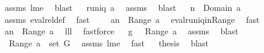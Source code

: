 \begin{isabellebody}
\ assms{\isacharparenleft}{}{\isacharcomma}{}{\isacharcomma}{}{\isacharparenright}\ lm{}{}e\ \isamarkupfalse%
\ blast\isanewline
{}\isamarkupfalse%
\ \isamarkupfalse%
\ {\isachardoublequoteopen}runiq\ {\isacharquery}a{\isachardoublequoteclose}\ \isamarkupfalse%
\ assms{\isacharparenleft}{}{\isacharcomma}{}{\isacharcomma}{}{\isacharparenright}\ \isamarkupfalse%
\ blast\isanewline
{}\isamarkupfalse%
\ \isamarkupfalse%
\ {\isachardoublequoteopen}n\ {\isasymin}\ Domain\ {\isacharquery}a{\isachardoublequoteclose}\ \isamarkupfalse%
\ assms{\isacharparenleft}{}{\isacharparenright}\ eval{\isacharunderscore}rel{\isacharunderscore}def\ \isamarkupfalse%
\ fast\isanewline
{}\isamarkupfalse%
\ \isamarkupfalse%
\ \isamarkupfalse%
\ {\isachardoublequoteopen}{\isacharquery}a{\isacharcomma}{\isacharcomma}n\ {\isasymin}\ Range\ {\isacharquery}a{\isachardoublequoteclose}\ \isamarkupfalse%
\ eval{\isacharunderscore}runiq{\isacharunderscore}in{\isacharunderscore}Range\ \isamarkupfalse%
\ fast\ \isanewline
{}\isamarkupfalse%
\ \isamarkupfalse%
\ {\isachardoublequoteopen}{\isacharquery}a{\isacharcomma}{\isacharcomma}{\isacharcomma}n\ {\isasymin}\ Range\ {\isacharquery}a{\isachardoublequoteclose}\ \isamarkupfalse%
\ lll{}{}\ \isamarkupfalse%
\ fastforce\isanewline
{}\isamarkupfalse%
\ \isamarkupfalse%
\ {\isachardoublequoteopen}g\ {\isasymin}\ {\isasymUnion}\ Range\ {\isacharquery}a{\isachardoublequoteclose}\ \isamarkupfalse%
\ assms\ \isamarkupfalse%
\ blast\ \isanewline
{}\isamarkupfalse%
\ \isamarkupfalse%
\ {\isachardoublequoteopen}{\isasymUnion}\ Range\ {\isacharquery}a\ {\isasymsubseteq}\ set\ G{\isachardoublequoteclose}\ \isamarkupfalse%
\ assms{\isacharparenleft}{}{\isacharcomma}{}{\isacharcomma}{}{\isacharparenright}\ lm{}{}e\ \isamarkupfalse%
\ fast\isanewline
{}\isamarkupfalse%
\ \isamarkupfalse%
\ {\isacharquery}thesis\ \isamarkupfalse%
\ blast\isanewline
{}\isamarkupfalse%

\end{isabellebody}
